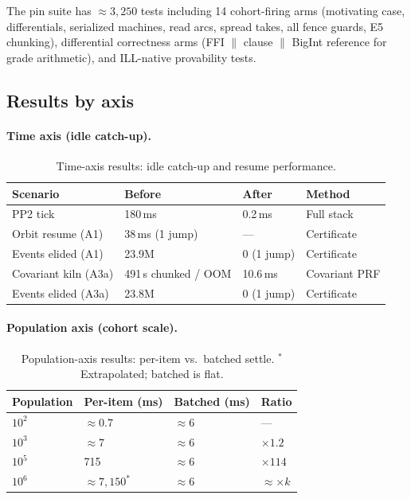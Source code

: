 \documentclass[11pt]{article}
\theoremstyle{remark}
\begin{document}
The pin suite has $\approx 3{,}250$ tests including 14 cohort-firing arms
(motivating case, differentials, serialized machines, read arcs, spread takes,
all fence guards, E5 chunking), differential correctness arms (FFI $\|$ clause $\|$
BigInt reference for grade arithmetic), and ILL-native provability tests.

\subsection{Results by axis}
\label{sec:results}

\paragraph{Time axis (idle catch-up).}

\begin{table}[ht]
\centering
\begin{tabular}{@{}llll@{}}
\toprule
Scenario              & Before               & After          & Method \\
\midrule
PP2 tick              & 180\,ms              & 0.2\,ms        & Full stack \\
Orbit resume (A1)     & 38\,ms (1 jump)      & ---            & Certificate \\
Events elided (A1)    & 23.9M                & 0 (1 jump)     & Certificate \\
Covariant kiln (A3a)  & 491\,s chunked / OOM & 10.6\,ms       & Covariant PRF \\
Events elided (A3a)   & 23.8M                & 0 (1 jump)     & Certificate \\
\bottomrule
\end{tabular}
\caption{Time-axis results: idle catch-up and resume performance.}
\label{tab:time-axis}
\end{table}

\paragraph{Population axis (cohort scale).}

\begin{table}[ht]
\centering
\begin{tabular}{@{}llll@{}}
\toprule
Population & Per-item (ms) & Batched (ms) & Ratio \\
\midrule
$10^2$ & $\approx 0.7$ & $\approx 6$ & --- \\
$10^3$ & $\approx 7$   & $\approx 6$ & $\times 1.2$ \\
$10^5$ & 715           & $\approx 6$ & $\times 114$ \\
$10^6$ & $\approx 7{,}150^*$ & $\approx 6$ & $\approx \times k$ \\
\bottomrule
\end{tabular}
\caption{Population-axis results: per-item vs.\ batched settle.
  ${}^*$Extrapolated; batched is flat.}
\label{tab:population-axis}
\end{table}
\end{document}
